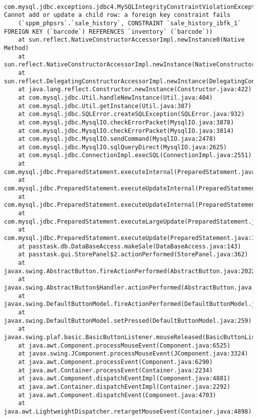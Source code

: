 \documentclass[11pt,a4paper]{article}
\begin{document}
		\begin{lstlisting}
 com.mysql.jdbc.exceptions.jdbc4.MySQLIntegrityConstraintViolationException: Cannot add or update a child row: a foreign key constraint fails 
	(`sppm_phpsrs`.`sale_history`, CONSTRAINT `sale_history_ibfk_1` FOREIGN KEY (`barcode`) REFERENCES `inventory` (`barcode`))
	at sun.reflect.NativeConstructorAccessorImpl.newInstance0(Native Method)
	at sun.reflect.NativeConstructorAccessorImpl.newInstance(NativeConstructorAccessorImpl.java:62)
	at sun.reflect.DelegatingConstructorAccessorImpl.newInstance(DelegatingConstructorAccessorImpl.java:45)
	at java.lang.reflect.Constructor.newInstance(Constructor.java:422)
	at com.mysql.jdbc.Util.handleNewInstance(Util.java:404)
	at com.mysql.jdbc.Util.getInstance(Util.java:387)
	at com.mysql.jdbc.SQLError.createSQLException(SQLError.java:932)
	at com.mysql.jdbc.MysqlIO.checkErrorPacket(MysqlIO.java:3878)
	at com.mysql.jdbc.MysqlIO.checkErrorPacket(MysqlIO.java:3814)
	at com.mysql.jdbc.MysqlIO.sendCommand(MysqlIO.java:2478)
	at com.mysql.jdbc.MysqlIO.sqlQueryDirect(MysqlIO.java:2625)
	at com.mysql.jdbc.ConnectionImpl.execSQL(ConnectionImpl.java:2551)
	at com.mysql.jdbc.PreparedStatement.executeInternal(PreparedStatement.java:1861)
	at com.mysql.jdbc.PreparedStatement.executeUpdateInternal(PreparedStatement.java:2073)
	at com.mysql.jdbc.PreparedStatement.executeUpdateInternal(PreparedStatement.java:2009)
	at com.mysql.jdbc.PreparedStatement.executeLargeUpdate(PreparedStatement.java:5094)
	at com.mysql.jdbc.PreparedStatement.executeUpdate(PreparedStatement.java:1994)
	at passtask.db.DataBaseAccess.makeSale(DataBaseAccess.java:143)
	at passtask.gui.StorePanel$2.actionPerformed(StorePanel.java:362)
	at javax.swing.AbstractButton.fireActionPerformed(AbstractButton.java:2022)
	at javax.swing.AbstractButton$Handler.actionPerformed(AbstractButton.java:2346)
	at javax.swing.DefaultButtonModel.fireActionPerformed(DefaultButtonModel.java:402)
	at javax.swing.DefaultButtonModel.setPressed(DefaultButtonModel.java:259)
	at javax.swing.plaf.basic.BasicButtonListener.mouseReleased(BasicButtonListener.java:252)
	at java.awt.Component.processMouseEvent(Component.java:6525)
	at javax.swing.JComponent.processMouseEvent(JComponent.java:3324)
	at java.awt.Component.processEvent(Component.java:6290)
	at java.awt.Container.processEvent(Container.java:2234)
	at java.awt.Component.dispatchEventImpl(Component.java:4881)
	at java.awt.Container.dispatchEventImpl(Container.java:2292)
	at java.awt.Component.dispatchEvent(Component.java:4703)
	at java.awt.LightweightDispatcher.retargetMouseEvent(Container.java:4898)

\end{lstlisting}
\end{document}
